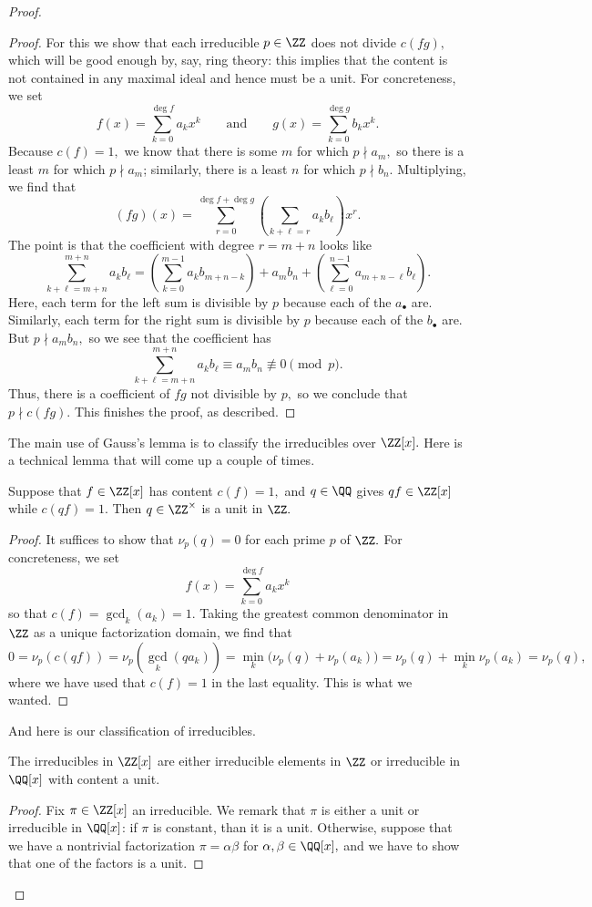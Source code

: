 \begin{proof}
\begin{proof}
		For this we show that each irreducible $p\in\ZZ$ does not divide $c(fg),$ which will be good enough by, say, ring theory: this implies that the content is not contained in any maximal ideal and hence must be a unit. For concreteness, we set
		\[f(x)=\sum_{k=0}^{\deg f}a_kx^k\qquad\text{and}\qquad g(x)=\sum_{k=0}^{\deg g}b_kx^k.\]
		Because $c(f)=1,$ we know that there is some $m$ for which $p\nmid a_m,$ so there is a least $m$ for which $p\nmid a_m$; similarly, there is a least $n$ for which $p\nmid b_n.$ Multiplying, we find that
		\[(fg)(x)=\sum_{r=0}^{\deg f+\deg g}\left(\sum_{k+\ell=r}a_kb_\ell\right)x^r.\]
		The point is that the coefficient with degree $r=m+n$ looks like
		\[\sum_{k+\ell=m+n}^{m+n}a_kb_\ell=\left(\sum_{k=0}^{m-1}a_kb_{m+n-k}\right)+a_mb_n+\left(\sum_{\ell=0}^{n-1}a_{m+n-\ell}b_\ell\right).\]
		Here, each term for the left sum is divisible by $p$ because each of the $a_\bullet$ are. Similarly, each term for the right sum is divisible by $p$ because each of the $b_\bullet$ are. But $p\nmid a_mb_n,$ so we see that the coefficient has
		\[\sum_{k+\ell=m+n}^{m+n}a_kb_\ell\equiv a_mb_n\not\equiv0\pmod p.\]
		Thus, there is a coefficient of $fg$ not divisible by $p,$ so we conclude that $p\nmid c(fg).$ This finishes the proof, as described.
	\end{proof}

	The main use of Gauss's lemma is to classify the irreducibles over $\ZZ[x].$ Here is a technical lemma that will come up a couple of times.
	\begin{lemma} \label{lem:technicalgauss}
		Suppose that $f\in\ZZ[x]$ has content $c(f)=1,$ and $q\in\QQ$ gives $qf\in\ZZ[x]$ while $c(qf)=1.$ Then $q\in\ZZ^\times$ is a unit in $\ZZ.$
	\end{lemma}
	\begin{proof}
		It suffices to show that $\nu_p(q)=0$ for each prime $p$ of $\ZZ.$ For concreteness, we set
		\[f(x)=\sum_{k=0}^{\deg f}a_kx^k\]
		so that $c(f)=\gcd_k(a_k)=1.$
		Taking the greatest common denominator in $\ZZ$ as a unique factorization domain, we find that
		\[0=\nu_p(c(qf))=\nu_p(\gcd_k(qa_k))=\min_k\big(\nu_p(q)+\nu_p(a_k)\big)=\nu_p(q)+\min_k\nu_p(a_k)=\nu_p(q),\]
		where we have used that $c(f)=1$ in the last equality. This is what we wanted.
	\end{proof}
	And here is our classification of irreducibles.
	\begin{lemma}
		The irreducibles in $\ZZ[x]$ are either irreducible elements in $\ZZ$ or irreducible in $\QQ[x]$ with content a unit.
	\end{lemma}
	\begin{proof}
		Fix $\pi\in\ZZ[x]$ an irreducible. We remark that $\pi$ is either a unit or irreducible in $\QQ[x]$: if $\pi$ is constant, than it is a unit. Otherwise, suppose that we have a nontrivial factorization $\pi=\alpha\beta$ for $\alpha,\beta\in\QQ[x],$ and we have to show that one of the factors is a unit.
		

\end{proof}
\end{proof}
